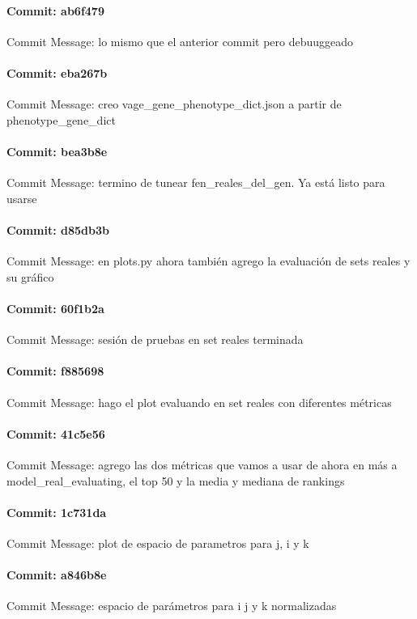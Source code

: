 \documentclass{article}
\begin{document}
\paragraph{Commit: ab6f479}
Commit Message: lo mismo que el anterior commit pero debuuggeado

\paragraph{Commit: eba267b}
Commit Message: creo vage_gene_phenotype_dict.json a partir de phenotype_gene_dict

\paragraph{Commit: bea3b8e}
Commit Message: termino de tunear fen_reales_del_gen. Ya está listo para usarse

\paragraph{Commit: d85db3b}
Commit Message: en plots.py ahora también agrego la evaluación de sets reales y su gráfico

\paragraph{Commit: 60f1b2a}
Commit Message: sesión de pruebas en set reales terminada

\paragraph{Commit: f885698}
Commit Message: hago el plot evaluando en set reales con diferentes métricas

\paragraph{Commit: 41c5e56}
Commit Message: agrego las dos métricas que vamos a usar de ahora en más a model_real_evaluating, el top 50 y la media y mediana de rankings

\paragraph{Commit: 1c731da}
Commit Message: plot de espacio de parametros para j, i y k

\paragraph{Commit: a846b8e}
Commit Message: espacio de parámetros para i j y k normalizadas
\end{document}
